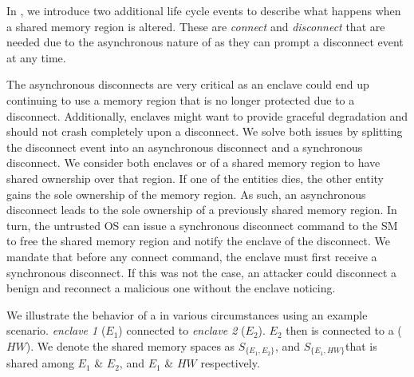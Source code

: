 In \name{}, we introduce two additional life cycle events to describe what happens when a shared memory region is altered. These are \emph{connect} and \emph{disconnect} that are needed due to the asynchronous nature of \sphw as they can prompt a disconnect event at any time.

The asynchronous disconnects are very critical as an enclave could end up continuing to use a memory region that is no longer protected due to a disconnect. Additionally, enclaves might want to provide graceful degradation and should not crash completely upon a disconnect. We solve both issues by splitting the disconnect event into an asynchronous disconnect and a synchronous disconnect. We consider both enclaves or \sphw of a shared memory region to have shared ownership over that region. If one of the entities dies, the other entity gains the sole ownership of the memory region. As such, an asynchronous disconnect leads to the sole ownership of a previously shared memory region. In turn, the untrusted OS can issue a synchronous disconnect command to the SM to free the shared memory region and notify the enclave of the disconnect. We mandate that before any connect command, the enclave must first receive a synchronous disconnect. If this was not the case, an attacker could disconnect a benign \sphw and reconnect a malicious one without the enclave noticing.


We illustrate the behavior of a \nameenclave{} in various circumstances using an example scenario. \emph{enclave 1} ($E_1$) connected to \emph{enclave 2} ($E_2$). $E_2$ then is connected to a \sphw ($HW$). We denote the shared memory spaces as $S_{\{E_1, E_2\}}$, and $S_{\{E_1, HW\}}$that is shared among $E_1$ \& $E_2$, and $E_1$ \& $HW$ respectively.

